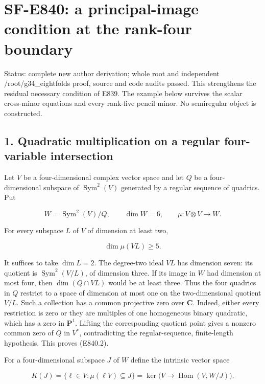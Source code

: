 \section{SF-E840: a principal-image condition at the rank-four
boundary}\label{SF-E840:sf-e840-a-principal-image-condition-at-the-rank-four-boundary}

Status: complete new author derivation; whole root and independent
/root/g34\_eightfolds proof, source and code audits passed. This
strengthens the residual necessary condition of E839. The example below
survives the scalar cross-minor equations and every rank-five pencil
minor. No semiregular object is constructed.

\subsection{1. Quadratic multiplication on a regular four-variable
intersection}\label{SF-E840:quadratic-multiplication-on-a-regular-four-variable-intersection}

Let \(V\) be a four-dimensional complex vector space and let \(Q\) be a
four-dimensional subspace of \(\operatorname{Sym}^2(V)\) generated by a
regular sequence of quadrics. Put

\[
 W=\operatorname{Sym}^2(V)/Q,
 \qquad \dim W=6,
 \qquad \mu:V\otimes V\longrightarrow W.
 \tag{E840.1}
\]

For every subspace \(L\) of \(V\) of dimension at least two,

\[
                     \dim\mu(VL)\ge5.
 \tag{E840.2}
\]

It suffices to take \(\dim L=2\). The degree-two ideal \(VL\) has
dimension seven: its quotient is \(\operatorname{Sym}^2(V/L)\), of
dimension three. If its image in \(W\) had dimension at most four, then
\(\dim(Q\cap VL)\) would be at least three. Thus the four quadrics in
\(Q\) restrict to a space of dimension at most one on the
two-dimensional quotient \(V/L\). Such a collection has a common
projective zero over \(\mathbf C\). Indeed, either every restriction is
zero or they are multiples of one homogeneous binary quadratic, which
has a zero in \(\mathbf P^1\). Lifting the corresponding quotient point
gives a nonzero common zero of \(Q\) in \(V^*\), contradicting the
regular-sequence, finite-length hypothesis. This proves (E840.2).

For a four-dimensional subspace \(J\) of \(W\) define the intrinsic
vector space

\[
 K(J)=\{\ell\in V:\mu(\ell V)\subseteq J\}
      =\ker\bigl(V\longrightarrow\operatorname{Hom}(V,W/J)\bigr).
 \tag{E840.3}
\]

